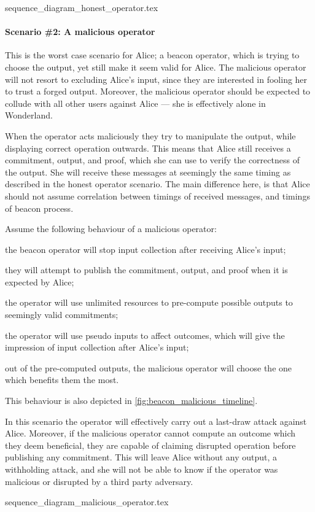 {sequence_diagram_honest_operator.tex}

\paragraph{Scenario \#2: A malicious operator}
This is the worst case scenario for Alice; a beacon operator, which is trying to choose the output, yet still make it seem valid for Alice.
The malicious operator will not resort to excluding Alice's input, since they are interested in fooling her to trust a forged output.
Moreover, the malicious operator should be expected to collude with all other users against Alice --- she is effectively alone in Wonderland.

When the operator acts maliciously they try to manipulate the output, while displaying correct operation outwards.
This means that Alice still receives a commitment, output, and proof, which she can use to verify the correctness of the output.
She will receive these messages at seemingly the same timing as described in the honest operator scenario.
The main difference here, is that Alice should not assume correlation between timings of received messages, and timings of beacon process.

Assume the following behaviour of a malicious operator:
\begin{eletterate*}
\item the beacon operator will stop input collection after receiving Alice's input;
\item they will attempt to publish the commitment, output, and proof when it is expected by Alice;
\item the operator will use unlimited resources to pre-compute possible outputs to seemingly valid commitments;
\item the operator will use pseudo inputs to affect outcomes, which will give the impression of input collection after Alice's input;
\item out of the pre-computed outputs, the malicious operator will choose the one which benefits them the most.
\end{eletterate*}
This behaviour is also depicted in \cref{fig:beacon_malicious_timeline}.

In this scenario the operator will effectively carry out a last-draw attack against Alice.
Moreover, if the malicious operator cannot compute an outcome which they deem beneficial, they are capable of claiming disrupted operation before publishing any commitment.
This will leave Alice without any output, a withholding attack, and she will not be able to know if the operator was malicious or disrupted by a third party adversary.

{sequence_diagram_malicious_operator.tex}
